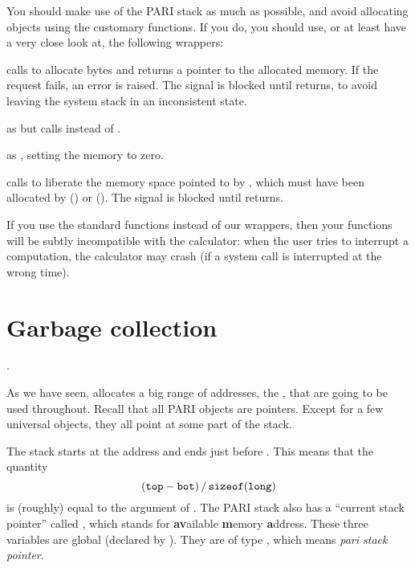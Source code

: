 You should make use of the PARI stack as much as possible, and avoid
allocating objects using the customary functions. If you do, you should
use, or at least have a very close look at, the following wrappers:

 calls  to allocate
 bytes and returns a pointer to the allocated memory. If the
request fails, an error is raised. The  signal is blocked until
 returns, to avoid leaving the system stack in an inconsistent
state.

 as  but
calls  instead of .

 as , setting the
memory to zero.

 calls  to liberate the memory space
pointed to by , which must have been allocated by 
() or  (). The  signal
is blocked until  returns.

If you use the standard  functions instead of our wrappers, then
your functions will be subtly incompatible with the  calculator: when
the user tries to interrupt a computation, the calculator may crash
(if a system call is interrupted at the wrong time).

\section{Garbage collection}\label{se:garbage}

.

\noindent
As we have seen,  allocates a big range of
addresses, the , that are going to be used throughout. Recall
that all PARI objects are pointers. Except for a few universal objects,
they all point at some part of the stack.

The stack starts at the address  and ends just before . This
means that the quantity
%
$$ ({\tt top} - {\tt bot})\,/\,{\tt sizeof(long)} $$
%
is (roughly) equal to the  argument of . The PARI
stack also has a ``current stack pointer'' called , which stands
for {\bf av}ailable {\bf m}emory {\bf a}ddress. These three variables are
global (declared by ). They are of type , which
means \emph{pari stack pointer}.

